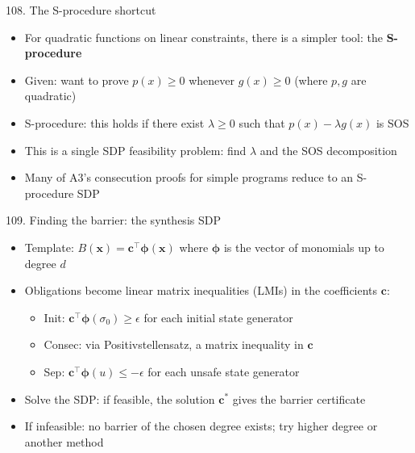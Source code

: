 \documentclass[aspectratio=169]{beamer}
\begin{document}
\begin{frame}{108. The S-procedure shortcut}
\begin{itemize}
  \item For quadratic functions on linear constraints, there is a simpler tool: the \textbf{S-procedure}
  \item Given: want to prove \(p(x) \ge 0\) whenever \(g(x) \ge 0\) (where \(p, g\) are quadratic)
  \item S-procedure: this holds if there exist \(\lambda \ge 0\) such that \(p(x) - \lambda g(x)\) is SOS
  \item This is a single SDP feasibility problem: find \(\lambda\) and the SOS decomposition
  \item Many of A3's consecution proofs for simple programs reduce to an S-procedure SDP
\end{itemize}
\end{frame}

\begin{frame}{109. Finding the barrier: the synthesis SDP}
\begin{itemize}
  \item Template: \(B(\mathbf{x}) = \mathbf{c}^\top \boldsymbol{\phi}(\mathbf{x})\) where \(\boldsymbol{\phi}\) is the vector of monomials up to degree \(d\)
  \item Obligations become linear matrix inequalities (LMIs) in the coefficients \(\mathbf{c}\):
    \begin{itemize}
      \item Init: \(\mathbf{c}^\top \boldsymbol{\phi}(\sigma_0) \ge \epsilon\) for each initial state generator
      \item Consec: via Positivstellensatz, a matrix inequality in \(\mathbf{c}\)
      \item Sep: \(\mathbf{c}^\top \boldsymbol{\phi}(u) \le -\epsilon\) for each unsafe state generator
    \end{itemize}
  \item Solve the SDP: if feasible, the solution \(\mathbf{c}^*\) gives the barrier certificate
  \item If infeasible: no barrier of the chosen degree exists; try higher degree or another method
\end{itemize}
\end{frame}
\end{document}
